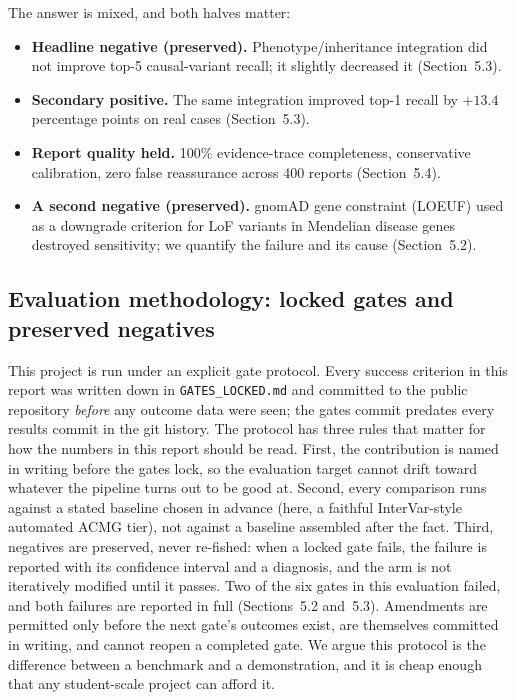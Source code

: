 \documentclass[11pt]{article}
\begin{document}
The answer is mixed, and both halves matter:
\begin{itemize}
\item \textbf{Headline negative (preserved).} Phenotype/inheritance integration did
not improve top-5 causal-variant recall; it slightly decreased it (Section~5.3).
\item \textbf{Secondary positive.} The same integration improved top-1 recall by
$+13.4$ percentage points on real cases (Section~5.3).
\item \textbf{Report quality held.} 100\% evidence-trace completeness, conservative
calibration, zero false reassurance across 400 reports (Section~5.4).
\item \textbf{A second negative (preserved).} gnomAD gene constraint (LOEUF) used as
a downgrade criterion for LoF variants in Mendelian disease genes destroyed
sensitivity; we quantify the failure and its cause (Section~5.2).
\end{itemize}

\subsection{Evaluation methodology: locked gates and preserved negatives}
This project is run under an explicit gate protocol. Every success criterion in
this report was written down in \texttt{GATES\_LOCKED.md} and committed to the
public repository \emph{before} any outcome data were seen; the gates commit
predates every results commit in the git history. The protocol has three rules that
matter for how the numbers in this report should be read. First, the contribution is
named in writing before the gates lock, so the evaluation target cannot drift toward
whatever the pipeline turns out to be good at. Second, every comparison runs against
a stated baseline chosen in advance (here, a faithful InterVar-style automated ACMG
tier), not against a baseline assembled after the fact. Third, negatives are
preserved, never re-fished: when a locked gate fails, the failure is reported with
its confidence interval and a diagnosis, and the arm is not iteratively modified
until it passes. Two of the six gates in this evaluation failed, and both failures
are reported in full (Sections~5.2 and~5.3). Amendments are permitted only before
the next gate's outcomes exist, are themselves committed in writing, and cannot
reopen a completed gate. We argue this protocol is the difference between a
benchmark and a demonstration, and it is cheap enough that any student-scale project
can afford it.
\end{document}

